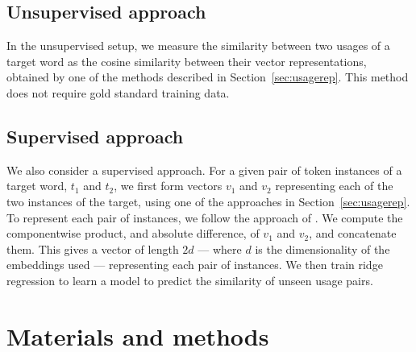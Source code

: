 \documentclass[11pt]{article}
\newcommand{\secref}[1]{Section~\ref{#1}}
\begin{document}
\subsection{Unsupervised approach}


In the unsupervised setup, we measure the similarity between two
usages of a target word as the cosine similarity between their vector
representations, obtained by one of the methods described in
\secref{sec:usagerep}. This method does not require gold standard
training data.



\subsection{Supervised approach}

We also consider a supervised approach. For a given pair of token
instances of a target word, $t_1$ and $t_2$, we first form vectors
$v_1$ and $v_2$ representing each of the two instances of the target,
using one of the approaches in \secref{sec:usagerep}.  To represent
each pair of instances, we follow the approach of .
We compute the componentwise product, and absolute difference, of
$v_1$ and $v_2$, and concatenate them. This gives a vector of length
$2d$ --- where $d$ is the dimensionality of the embeddings used ---
representing each pair of instances. We then train ridge regression to
learn a model to predict the similarity of unseen usage pairs.




\section{Materials and methods\label{sec:mandm}}
\end{document}

